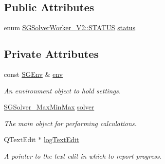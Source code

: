\subsection*{Public Attributes}
\begin{DoxyCompactItemize}
\item 
enum \hyperlink{classSGSolverWorker__V2_a252099560187dceadfe97c1bd335c561}{S\+G\+Solver\+Worker\+\_\+\+V2\+::\+S\+T\+A\+T\+US} \hyperlink{classSGSolverWorker__V2_a87eb50e8f1b9c3740cf92de43c995023}{status}
\end{DoxyCompactItemize}
\subsection*{Private Attributes}
\begin{DoxyCompactItemize}
\item 
\mbox{\label{classSGSolverWorker__V2_a6d12bc5ad9d95a17501b0837557e2579}} 
const \hyperlink{classSGEnv}{S\+G\+Env} \& \hyperlink{classSGSolverWorker__V2_a6d12bc5ad9d95a17501b0837557e2579}{env}
\begin{DoxyCompactList}\small\item\em An environment object to hold settings. \end{DoxyCompactList}\item 
\mbox{\label{classSGSolverWorker__V2_aaa01f1ac6a3c6839302c00c1bfdc96f6}} 
\hyperlink{classSGSolver__MaxMinMax}{S\+G\+Solver\+\_\+\+Max\+Min\+Max} \hyperlink{classSGSolverWorker__V2_aaa01f1ac6a3c6839302c00c1bfdc96f6}{solver}
\begin{DoxyCompactList}\small\item\em The main object for performing calculations. \end{DoxyCompactList}\item 
\mbox{\label{classSGSolverWorker__V2_a69b418eb2d71414fbc6f57fedbb9c243}} 
Q\+Text\+Edit $\ast$ \hyperlink{classSGSolverWorker__V2_a69b418eb2d71414fbc6f57fedbb9c243}{log\+Text\+Edit}
\begin{DoxyCompactList}\small\item\em A pointer to the text edit in which to report progress. \end{DoxyCompactList}\item 
\mbox{\label{classSGSolverWorker__V2_a6d19ed64fc70a400897d1667d41f1207}} 

\end{DoxyCompactItemize}
